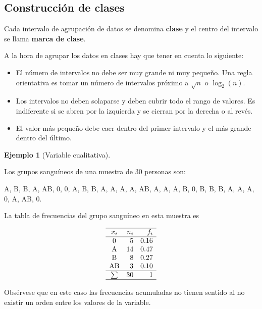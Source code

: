 \documentclass[
  spanish,
  a4paper,
]{scrreport}
\providecommand{\tightlist}{%
  \setlength{\itemsep}{0pt}\setlength{\parskip}{0pt}}
\theoremstyle{plain}
\theoremstyle{definition}
\newtheorem{example}{Ejemplo}[chapter]
\theoremstyle{definition}
\theoremstyle{remark}
\begin{document}
\subsection{Construcción de clases}\label{construcciuxf3n-de-clases}

Cada intervalo de agrupación de datos se denomina \textbf{clase} y el
centro del intervalo se llama \textbf{marca de clase}.

A la hora de agrupar los datos en clases hay que tener en cuenta lo
siguiente:

\begin{itemize}
\tightlist
\item
  El número de intervalos no debe ser muy grande ni muy pequeño. Una
  regla orientativa es tomar un número de intervalos próximo a
  \(\sqrt{n}\) o \(\log_2(n)\).
\item
  Los intervalos no deben solaparse y deben cubrir todo el rango de
  valores. Es indiferente si se abren por la izquierda y se cierran por
  la derecha o al revés.
\item
  El valor más pequeño debe caer dentro del primer intervalo y el más
  grande dentro del último.
\end{itemize}

\begin{example}[Variable
cualitativa]\protect\hypertarget{exm-tabla-frecuencias-cualitativa}{}\label{exm-tabla-frecuencias-cualitativa}

Los grupos sanguíneos de una muestra de 30 personas son:

A, B, B, A, AB, 0, 0, A, B, B, A, A, A, A, AB, A, A, A, B, 0, B, B, B,
A, A, A, 0, A, AB, 0.

La tabla de frecuencias del grupo sanguíneo en esta muestra es

\[
\begin{array}{crr}
\hline
x_i & n_i & f_i \\
\hline
\mbox{0} & 5 & 0.16 \\
\mbox{A} & 14 & 0.47 \\
\mbox{B} & 8 & 0.27 \\
\mbox{AB} & 3 & 0.10 \\
\hline
\sum & 30 & 1 \\
\hline
\end{array}
\]

\end{example}

\begin{tcolorbox}[enhanced jigsaw, arc=.35mm, bottomrule=.15mm, bottomtitle=1mm, breakable, colback=white, colbacktitle=quarto-callout-warning-color!10!white, colframe=quarto-callout-warning-color-frame, coltitle=black, left=2mm, leftrule=.75mm, opacityback=0, opacitybacktitle=0.6, rightrule=.15mm, title=\textcolor{quarto-callout-warning-color}{\faExclamationTriangle}\hspace{0.5em}{Advertencia}, titlerule=0mm, toprule=.15mm, toptitle=1mm]

Obsérvese que en este caso las frecuencias acumuladas no tienen sentido
al no existir un orden entre los valores de la variable.

\end{tcolorbox}
\end{document}
